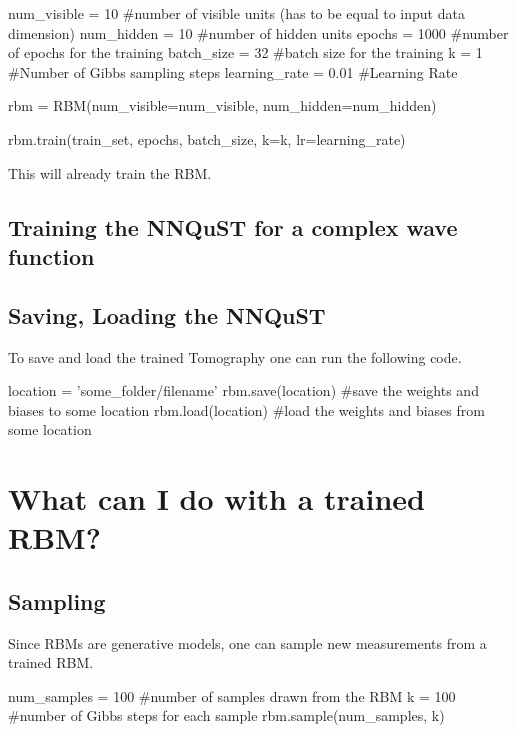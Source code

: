 \documentclass[a4paper]{article}
\begin{document}
\begin{python}
num_visible = 10 #number of visible units (has to be equal to input data dimension)
num_hidden = 10 #number of hidden units
epochs = 1000 #number of epochs for the training
batch_size = 32 #batch size for the training
k = 1 #Number of Gibbs sampling steps
learning_rate = 0.01 #Learning Rate
\end{python}



\begin{python}
rbm = RBM(num_visible=num_visible, num_hidden=num_hidden)

rbm.train(train_set, epochs, batch_size, k=k, lr=learning_rate)
\end{python}

This will already train the RBM.

\subsection{Training the NNQuST for a complex wave function}


\subsection{Saving, Loading the NNQuST}

To save and load the trained Tomography one can run the following code.

\begin{python}
location = 'some_folder/filename'
rbm.save(location) #save the weights and biases to some location
rbm.load(location) #load the weights and biases from some location
\end{python}

\section{What can I do with a trained RBM?}

\subsection{Sampling}

Since RBMs are generative models, one can sample new measurements from a trained RBM.

\begin{python}
num_samples = 100 #number of samples drawn from the RBM
k = 100 #number of Gibbs steps for each sample
rbm.sample(num_samples, k)
\end{python}
\end{document}

